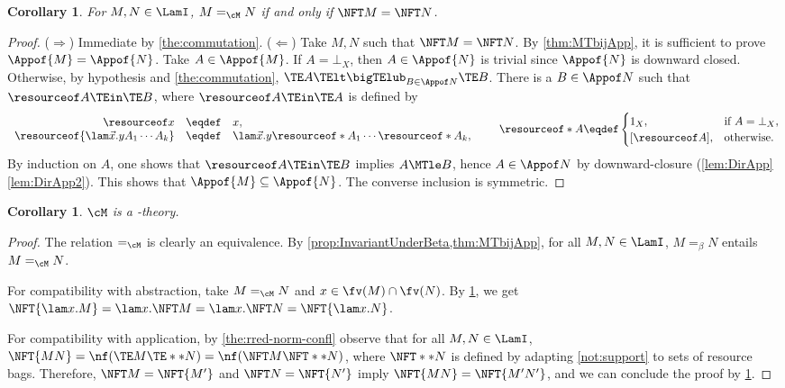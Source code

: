 \documentclass[10pt,a4paper]{amsart}
\newtheorem{corollary}[theorem]{Corollary}
\theoremstyle{definition}
\begin{document}
\begin{corollary} \label{cor:MTeqIffNFTeq}
	For $M,N\in\LamI$, $M =_\cM N$ if and only if $\NFT M = \NFT N$.
\end{corollary}
	\begin{proof}
	($\Rightarrow$)
	Immediate by \cref{the:commutation}.
	($\Leftarrow$)
	Take $M,N$ such that $\NFT M = \NFT N$. 
	By \cref{thm:MTbijApp}, it is sufficient to prove 
	$\Appof{M} = \Appof{N}$.
	Take $A\in\Appof{M}$. 
	If $A = \bot_X$, then $A \in \Appof{N}$ is trivial 
		since $\Appof{N}$ is downward closed.
	Otherwise, by hypothesis and \cref{the:commutation},
		$\TE A \TElt \bigTElub_{B \in \Appof N} \TE  B$.
		There is a $B \in \Appof N$ such that
		$\resourceof A \TEin \TE B$,
		where $\resourceof A \TEin \TE A$ is defined by
		\[
		\begin{array}{rcl}
		\resourceof x &\eqdef& x,\\
\resourceof{\lam \vec{x}.yA_1\cdots A_k} &\eqdef&
			\lam \vec{x}.y\resourceof*{A_1}\cdots \resourceof*{A_k},\\	
		\end{array}
		\qquad
		\resourceof*{A} \eqdef
		\begin{cases}
		1_X,&\textrm{if }A = \bot_X,\\
		{[\resourceof A]},&\textrm{otherwise}.
		\end{cases}
		\]
		By induction on $A$, one shows that
		$\resourceof A \TEin \TE B$ implies $A \MTle B$,
		hence $A \in \Appof N$ by downward-closure
		(\cref{lem:DirApp}\eqref{lem:DirApp2}).
	This shows that $\Appof{M} \subseteq \Appof{N}$.
	The converse inclusion is symmetric.
	\end{proof}

\begin{corollary}\label{cor:MisALamITheory} 
	$\cM$ is a \lamI-theory.
\end{corollary}

\begin{proof}
	The relation $=_\cM$ is clearly an equivalence.
	By \cref{prop:InvariantUnderBeta,thm:MTbijApp}, 
	for all $M,N\in\LamI$, $M =_\beta N$ entails $M =_\cM N$.
	
	For compatibility with abstraction, 
	take $M =_\cM N$ and $x \in \fv(M) \cap \fv(N)$. 
	By \cref{cor:MTeqIffNFTeq}, we get 
	$\NFT{\lam x.M} = \lam x.\NFT M = \lam x.\NFT N = \NFT{\lam x.N}$.
	
	For compatibility with application, 
	by \cref{the:rred-norm-confl} observe that for all $M,N \in \LamI$, 
	$\NFT{MN} = \nf(\TE M \TE** N) = \nf(\NFT M \NFT** N)$,
	where $\NFT** N$ is defined by adapting
	\cref{not:support} to sets of resource bags.
	Therefore, $\NFT M = \NFT{M'}$ and $\NFT N = \NFT{N'}$ 
	imply $\NFT{MN} = \NFT{M'N'}$, and
	we can conclude the proof by \cref{cor:MTeqIffNFTeq}.
\end{proof}
\end{document}
